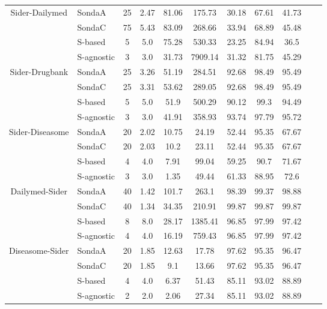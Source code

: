 \begin{center}
\begin{table*}[h]
\begin{tabular}{|c|l|c|c|c|c|c|c|c|c|c|}
\multirow{4}{*}{Sider-Dailymed} & SondaA   & 25 & 2.47   & 81.06  & 175.73   & 30.18 & 67.61 & 41.73   \\
											& SondaC  & 75 & 5.43   & 83.09  & 268.66    & 33.94 & 68.89 & 45.48 \\
											& S-based    & 5 & 5.0   & 75.28  & 530.33 & 23.25 & 84.94 & 36.5 \\
 											& S-agnostic     & 3 & 3.0   & 31.73  & 7909.14      & 31.32 & 81.75 & 45.29 \\ \hline 		
 																							
\multirow{4}{*}{Sider-Drugbank} & SondaA  & 25 & 3.26   & 51.19  & 284.51 & 92.68 & 98.49 & 95.49   \\
											& SondaC   & 25 & 3.31   & 53.62  & 289.05 & 92.68 & 98.49 & 95.49  \\
											& S-based    & 5 & 5.0   & 51.9  & 500.29   & 90.12 & 99.3 & 94.49\\
 											& S-agnostic      & 3 & 3.0   & 41.91  & 358.93 & 93.74 & 97.79 & 95.72  \\ \hline 											

\multirow{4}{*}{Sider-Diseasome} & SondaA    & 20 & 2.02   & 10.75  & 24.19     & 52.44 & 95.35 & 67.67\\
											& SondaC    & 20 & 2.03   & 10.2  & 23.11 & 52.44 & 95.35 & 67.67  \\
											& S-based    & 4 & 4.0   & 7.91  & 99.04  & 59.25 & 90.7 & 71.67\\
 											& S-agnostic    & 3 & 3.0   & 1.35  & 49.44  & 61.33 & 88.95 & 72.6      \\ \hline 		 									

\multirow{4}{*}{Dailymed-Sider} & SondaA    & 40 & 1.42   & 101.7  & 263.1   & 98.39 & 99.37 & 98.88  \\
											& SondaC  & 40 & 1.34   & 34.35  & 210.91  & 99.87 & 99.87 & 99.87 \\
											& S-based    & 8 & 8.0   & 28.17  & 1385.41  & 96.85 & 97.99 & 97.42\\
 											& S-agnostic    & 4 & 4.0   & 16.19  & 759.43    & 96.85 & 97.99 & 97.42  \\ \hline 		

\multirow{4}{*}{Diseasome-Sider} & SondaA    & 20 & 1.85   & 12.63  & 17.78   & 97.62 & 95.35 & 96.47  \\
											& SondaC   & 20 & 1.85   & 9.1  & 13.66   & 97.62 & 95.35 & 96.47 \\
											& S-based  & 4 & 4.0   & 6.37  & 51.43   & 85.11 & 93.02 & 88.89 \\
 											& S-agnostic    & 2 & 2.0   & 2.06  & 27.34   & 85.11 & 93.02 & 88.89  \\ \hline 		 									


\end{tabular}
\end{table*}
\end{center}

